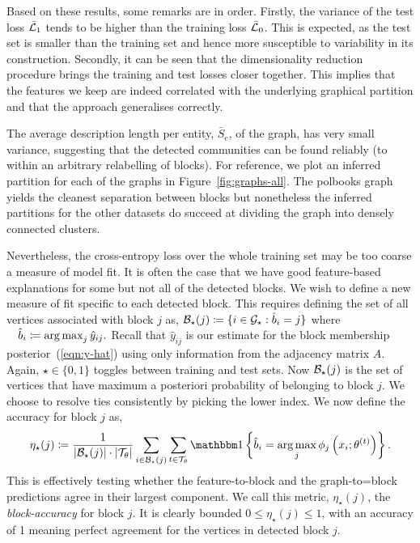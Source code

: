Based on these results, some remarks are in order.
Firstly, the variance of the test loss $\bar{\mathcal{L}}_1$ tends to be higher 
than the training loss $\bar{\mathcal{L}}_0$. This is expected,
as the test set is smaller than the training set and hence 
more susceptible to variability in its construction. 
Secondly, it can be seen that the dimensionality reduction procedure 
brings the training and test losses closer together. This implies that 
the features we keep are indeed correlated with the underlying graphical 
partition and that the approach generalises correctly.

The average description length per entity,
$\bar{S}_e$, of the graph, 
has very small variance, suggesting that
the detected communities can be found reliably (to within an arbitrary 
relabelling of blocks). For reference, we plot an inferred partition for each 
of the graphs in Figure~\ref{fig:graphs-all}. The polbooks graph yields the cleanest separation between blocks but nonetheless the inferred partitions for the other datasets do succeed at dividing the graph into densely connected clusters.

Nevertheless, the cross-entropy loss over the whole training set may be too coarse a measure of model fit. It is often the case that we have good feature-based explanations for some but not all of the detected blocks. We wish to define a new measure of fit specific to each detected block. This requires defining the set of all vertices associated with block $j$ as,
$
	\mathcal{B}_\star(j) \coloneqq \{i \in \mathcal{G}_\star : \hat{b}_i = j\}
$
where
$ 
	\quad \hat{b}_i \coloneqq \operatorname*{arg\,max}_j \hat{y}_{ij}.
$
Recall that $\hat{y}_{ij}$ is our estimate for the block membership posterior~(\ref{eqn:y-hat}) using only information from the adjacency matrix $A$. Again, $\star \in \{0, 1\}$ toggles between training and test sets. Now $\mathcal{B}_\star(j)$ is the set of vertices that have maximum a posteriori probability of belonging to block $j$. We choose to resolve ties consistently by picking the lower index. We now define the accuracy for block $j$ as,
%
\begin{equation}
	\eta_\star(j) \coloneqq \frac{1}{|\Bcal_\star (j)| \cdot 
	|\Tcal_\theta| } 
	\sum_{i \in \Bcal_\star (j)}  \sum_{t \in \Tcal_\theta}
	\one \left\{\hat{b}_i = \argmax_j \phi_j \left( x_i; \theta^{(t)} \right) \right\}.
	\label{eqn:accuracy}
\end{equation}
%
This is effectively testing whether the feature-to-block and the graph-to=block predictions agree in their largest component. We call this metric, $\eta_\star(j)$, the {\em block-accuracy} for block $j$. It is clearly bounded $0 \leq \eta_\star(j) \leq 1$, with an accuracy of 1 meaning perfect agreement for the vertices in detected block $j$.

